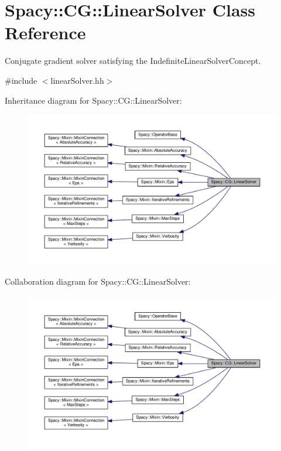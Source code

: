 \hypertarget{classSpacy_1_1CG_1_1LinearSolver}{}\section{Spacy\+:\+:C\+G\+:\+:Linear\+Solver Class Reference}
\label{classSpacy_1_1CG_1_1LinearSolver}


Conjugate gradient solver satisfying the Indefinite\+Linear\+Solver\+Concept.  




{\ttfamily \#include $<$linear\+Solver.\+hh$>$}



Inheritance diagram for Spacy\+:\+:C\+G\+:\+:Linear\+Solver\+:\nopagebreak
\begin{figure}[H]
\begin{center}
\leavevmode
\includegraphics[width=350pt]{classSpacy_1_1CG_1_1LinearSolver__inherit__graph}
\end{center}
\end{figure}


Collaboration diagram for Spacy\+:\+:C\+G\+:\+:Linear\+Solver\+:\nopagebreak
\begin{figure}[H]
\begin{center}
\leavevmode
\includegraphics[width=350pt]{classSpacy_1_1CG_1_1LinearSolver__coll__graph}
\end{center}
\end{figure}
